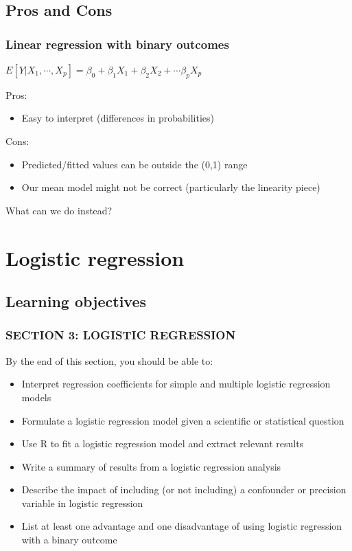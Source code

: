 \documentclass[12pt, 
hyperref={colorlinks=true, linkcolor=blue, urlcolor=cyan}]{beamer}
\begin{document}
\subsection{Pros and Cons}
\begin{frame}
\frametitle{Linear regression with binary outcomes}
\begin{center} $E[Y|X_1,\cdots,X_p] = \beta_0 + \beta_1 X_1 + \beta_2 X_2 + \cdots \beta_p X_p$ \end{center}

Pros: \vspace{-0.3cm}
\begin{itemize}
\item Easy to interpret (differences in probabilities)
\end{itemize}

Cons: \vspace{-0.3cm}
\begin{itemize}
\item Predicted/fitted values can be outside the (0,1) range
\item Our mean model might not be correct (particularly the linearity piece)%
\end{itemize}

What can we do instead?
\end{frame}

\section{Logistic regression}
\subsection{Learning objectives}
\begin{frame}
\frametitle{SECTION 3: LOGISTIC REGRESSION}

By the end of this section, you should be able to:
\begin{itemize}
\item Interpret regression coefficients for simple and multiple logistic regression models
\item Formulate a logistic regression model given a scientific or statistical question 
\item Use R to fit a logistic regression model and extract relevant results
\item Write a summary of results from a logistic regression analysis
\item Describe the impact of including (or not including) a confounder or precision variable in logistic regression
\item List at least one advantage and one disadvantage of using logistic regression with a binary outcome
\end{itemize}
\end{frame}
\end{document}
